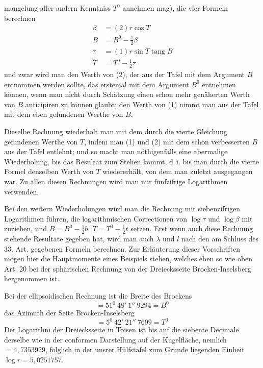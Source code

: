 %
mangelung aller andern Kenntniss \(T^0\) annehmen mag), die vier Formeln berechnen
\[
\begin{aligned}
\beta&=(2)r\cos T\\
B&=B^0-\tfrac12\beta\\
\tau&=(1)r\sin T\operatorname{tang}B\\
T&=T^0-\tfrac12\tau
\end{aligned}
\]
und zwar wird man den Werth von (2), der aus der Tafel mit dem Argument \(B\) entnommen werden sollte, das erstemal mit dem Argument \(B^0\) entnehmen können, wenn man nicht durch Schätzung einen schon mehr genäherten Werth von \(B\) anticipiren zu können glaubt; den Werth von (1) nimmt man aus der Tafel mit dem eben gefundenen Werthe von \(B\).

Dieselbe Rechnung wiederholt man mit dem durch die vierte Gleichung gefundenen Werthe von \(T\), indem man (1) und (2) mit dem schon verbesserten \(B\) aus der Tafel entlehnt; und so macht man nöthigenfalls eine abermalige Wiederholung, bis das Resultat zum Stehen kommt, d.\,i. bis man durch die vierte Formel denselben Werth von \(T\) wiedererhält, von dem man zuletzt ausgegangen war. Zu allen diesen Rechnungen wird man nur fünfzifrige Logarithmen verwenden.

Bei den weitern Wiederholungen wird man die Rechnung mit siebenzifrigen Logarithmen führen, die logarithmischen Correctionen von \(\log\tau\) und \(\log\beta\) mit zuziehen, und \(B=B^0-\tfrac12b,\ T=T^0-\tfrac12t\) setzen. Erst wenn auch diese Rechnung stehende Resultate gegeben hat, wird man auch \(\lambda\) und \(l\) nach den am Schluss des 33. Art. gegebenen Formeln berechnen. Zur Erläuterung dieser Vorschriften mögen hier die Hauptmomente eines Beispiels stehen, welches eben so wie oben Art. 20 bei der sphärischen Rechnung von der Dreiecksseite Brocken-Inselsberg hergenommen ist.

Bei der ellipsoidischen Rechnung ist die Breite des Brockens
\[
=51^0\ 48'\ 1''\ 9294=B^0
\]
das Azimuth der Seite Brocken-Inselsberg
\[
=5^0\ 42'\ 21''\ 7699=T^0
\]
Der Logarithm der Dreiecksseite in Toisen ist bis auf die siebente Decimale derselbe wie in der conformen Darstellung auf der Kugelfläche, nemlich \(=4{,}7353929\), folglich in der unsrer Hülfstafel zum Grunde liegenden Einheit \(\log r=5{,}0251757\).
